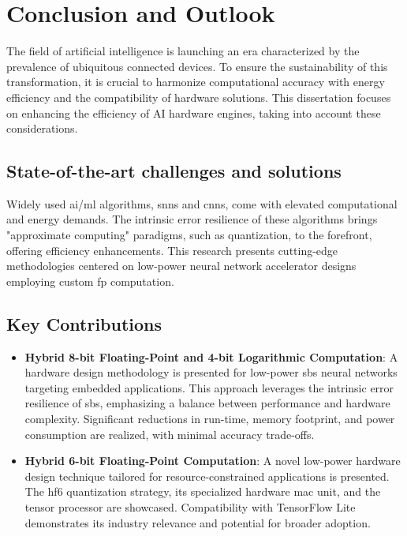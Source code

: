 \chapter{Conclusion and Outlook}
\label{chap.conclusion}
\minitoc
The field of artificial intelligence is launching an era characterized by the prevalence of ubiquitous connected devices. To ensure the sustainability of this transformation, it is crucial to harmonize computational accuracy with energy efficiency and the compatibility of hardware solutions. This dissertation focuses on enhancing the efficiency of AI hardware engines, taking into account these considerations.

\section{State-of-the-art challenges and solutions}
Widely used \gls{ai}/\gls{ml} algorithms, \glspl{snn} and \glspl{cnn}, come with elevated computational and energy demands. The intrinsic error resilience of these algorithms brings "approximate computing" paradigms, such as quantization, to the forefront, offering efficiency enhancements. This research presents cutting-edge methodologies centered on low-power neural network accelerator designs employing custom \gls{fp} computation.

\section{Key Contributions}
\begin{itemize}
	\item \textbf{Hybrid 8-bit Floating-Point and 4-bit Logarithmic Computation}: A hardware design methodology is presented for low-power \gls{sbs} neural networks targeting embedded applications. This approach leverages the intrinsic error resilience of \gls{sbs}, emphasizing a balance between performance and hardware complexity. Significant reductions in run-time, memory footprint, and power consumption are realized, with minimal accuracy trade-offs.
	
	\item \textbf{Hybrid 6-bit Floating-Point Computation}: A novel low-power hardware design technique tailored for resource-constrained applications is presented. The \gls{hf6} quantization strategy, its specialized hardware \gls{mac} unit, and the tensor processor are showcased. Compatibility with TensorFlow Lite demonstrates its industry relevance and potential for broader adoption.
\end{itemize}

